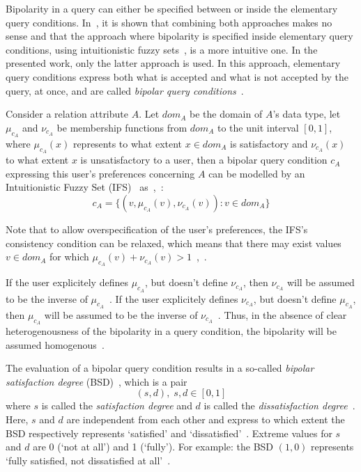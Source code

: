 \documentclass[runningheads,a4paper]{llncs}
\begin{document}
Bipolarity in a query can either be specified between or inside the elementary query conditions. In~\cite{Matthe2011ijis}, it is shown that combining both approaches makes no sense and that the approach where bipolarity is specified inside elementary query conditions, using intuitionistic fuzzy sets~\cite{Atanassov1986fss}, is a more intuitive one. In the presented work, only the latter approach is used. In this approach, elementary query conditions express both what is accepted and what is not accepted by the query, at once, and are called \emph{bipolar query conditions}~\cite{Matthe2011ijis}.

Consider a relation attribute $A$. Let $dom_{A}$ be the domain of $A$'s data type, let $\mu_{c_{A}}$ and $\nu_{c_{A}}$ be membership functions from $dom_{A}$ to the unit interval $\left[0, 1\right]$, where $\mu_{c_{A}}(x)$ represents to what extent $x \in dom_{A}$ is satisfactory and $\nu_{c_{A}}(x)$ to what extent $x$ is unsatisfactory to a user, then a bipolar query condition $c_{A}$ expressing this user's preferences concerning $A$ can be modelled by an Intuitionistic Fuzzy Set (IFS)~\cite{Atanassov1986fss} as~\cite{Matthe2011ijis},~\cite{DeTre2010ieeetfs}:
\begin{equation}
c_{A} = \{(v, \mu_{c_{A}}(v), \nu_{c_{A}}(v)) : v \in dom_{A}\}
\end{equation}

Note that to allow overspecification of the user's preferences, the IFS's consistency condition can be relaxed, which means that there may exist values $v \in dom_{A}$ for which $\mu_{c_{A}}(v) + \nu_{c_{A}}(v) > 1$~\cite{Matthe2011ijis},~\cite{DeTre2010ieeetfs}.

If the user explicitely defines $\mu_{c_{A}}$, but doesn't define $\nu_{c_{A}}$, then $\nu_{c_{A}}$ will be assumed to be the inverse of $\mu_{c_{A}}$~\cite{Matthe2011ijis}. If the user explicitely defines $\nu_{c_{A}}$, but doesn't define $\mu_{c_{A}}$, then $\mu_{c_{A}}$ will be assumed to be the inverse of $\nu_{c_{A}}$~\cite{Matthe2011ijis}. Thus, in the absence of clear heterogenousness of the bipolarity in a query condition, the bipolarity will be assumed homogenous~\cite{Matthe2011ijis}.

The evaluation of a bipolar query condition results in a so-called {\em bipolar satisfaction degree} (BSD)~\cite{Matthe2011ijis}, which is a pair
\begin{equation}
(s,d),\; s,d \in [0,1] \nonumber
\end{equation}
where $s$ is called the \emph{satisfaction degree} and $d$ is called the \emph{dissatisfaction degree}~\cite{Matthe2011ijis}. Here, $s$ and $d$ are independent from each other and express to which extent the BSD respectively represents `satisfied' and `dissatisfied'~\cite{Matthe2011ijis}. Extreme values for $s$ and $d$ are 0 (`not at all') and 1 (`fully'). For example: the BSD $(1,0)$ represents `fully satisfied, not dissatisfied at all'~\cite{Matthe2011ijis}.
\end{document}
